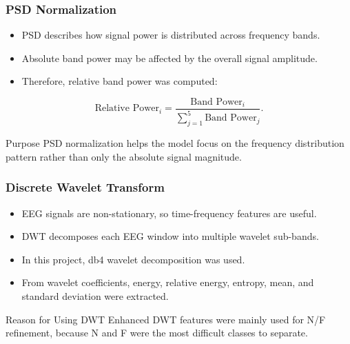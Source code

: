 \documentclass{beamer}
\begin{document}
\begin{frame}
\frametitle{PSD Normalization}
\begin{itemize}
\item PSD describes how signal power is distributed across frequency bands.
\item Absolute band power may be affected by the overall signal amplitude.
\item Therefore, relative band power was computed:
\end{itemize}

$$
\text{Relative Power}_i =
\frac{\text{Band Power}_i}
{\sum_{j=1}^{5}\text{Band Power}_j}.
$$

\begin{block}{Purpose}
PSD normalization helps the model focus on the frequency distribution pattern rather than only the absolute signal magnitude.
\end{block}
\end{frame}

\begin{frame}
\frametitle{Discrete Wavelet Transform}
\begin{itemize}
\item EEG signals are non-stationary, so time-frequency features are useful.
\item DWT decomposes each EEG window into multiple wavelet sub-bands.
\item In this project, db4 wavelet decomposition was used.
\item From wavelet coefficients, energy, relative energy, entropy, mean, and standard deviation were extracted.
\end{itemize}

\begin{block}{Reason for Using DWT}
Enhanced DWT features were mainly used for N/F refinement, because N and F were the most difficult classes to separate.
\end{block}
\end{frame}
\end{document}
